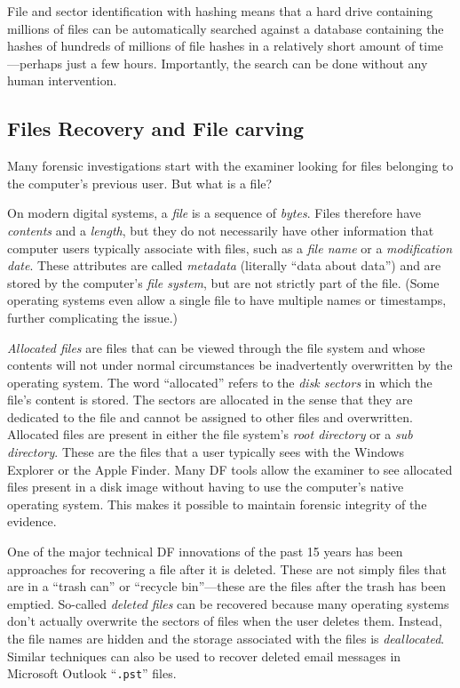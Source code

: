 File and sector identification with hashing means that a hard drive
containing millions of files can be automatically searched against a
database containing the hashes of hundreds of millions of file hashes
in a relatively short amount of time---perhaps just a few hours. Importantly, the search can be done without any human
intervention.

\subsection{Files Recovery and File carving}

Many forensic investigations start with the examiner looking for
files belonging to the computer's previous user. But what is a file?

On modern digital systems, a \emph{file} is a sequence of
\emph{bytes}. Files therefore
have \emph{contents} and a \emph{length}, but they do not necessarily have other
information that computer users typically associate with files, such
as a \emph{file name} or a \emph{modification date}. These attributes
are called \emph{metadata} (literally ``data about data'')
and are stored by the computer's \emph{file system}, but are not
strictly part of the file. (Some operating systems even allow a single
file to have multiple names or timestamps, further complicating the
issue.)

\emph{Allocated files} are files that can be viewed
through the file system and whose contents will not under normal
circumstances be inadvertently overwritten by the operating
system. The word ``allocated'' refers to the \emph{disk sectors} in
which the file's content is stored. The sectors are allocated in the
sense that they are dedicated to the file and cannot be assigned to
other files and overwritten. Allocated files are present in either the
file system's \emph{root directory} or a \emph{sub directory}. These
are the files that a user typically sees with the Windows Explorer or
the Apple Finder. Many DF tools allow the examiner to see allocated
files present in a disk image without having to use the computer's
native operating system. This makes it possible to maintain forensic
integrity of the evidence.

One of the major technical DF innovations of the
past 15 years has been approaches for
recovering a file after it is deleted. These are not simply files that are in
a ``trash can'' or ``recycle bin''---these are the files after the
trash has been emptied. So-called \emph{deleted files} can be
recovered because many operating systems don't actually overwrite the
sectors of files when the user deletes them. Instead, the file names
are hidden and the storage associated with the files is
\emph{deallocated}. Similar techniques can also be used to
recover deleted email messages in Microsoft Outlook ``\texttt{.pst}'' files.

